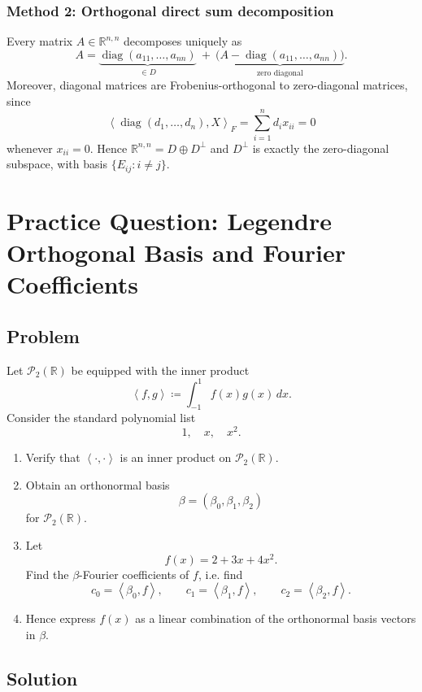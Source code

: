 \documentclass[12pt]{article}
\newcommand{\df}{\coloneqq}
\newcommand{\R}{\mathbb{R}}
\newcommand{\cP}{\mathcal{P}}
\DeclareMathOperator{\diag}{diag}
\newcommand{\ip}[2]{\left\langle #1,#2\right\rangle}
\begin{document}
\subsubsection{Method 2: Orthogonal direct sum decomposition}
Every matrix $A\in\R^{n,n}$ decomposes uniquely as
\[
A=\underbrace{\diag(a_{11},\dots,a_{nn})}_{\in D}\ +\ \underbrace{\bigl(A-\diag(a_{11},\dots,a_{nn})\bigr)}_{\text{zero diagonal}}.
\]
Moreover, diagonal matrices are Frobenius-orthogonal to zero-diagonal matrices, since
\[
\ip{\diag(d_1,\dots,d_n)}{X}_F=\sum_{i=1}^n d_i x_{ii}=0
\]
whenever $x_{ii}=0$. Hence $\R^{n,n}=D\oplus D^\perp$ and $D^\perp$ is exactly the zero-diagonal subspace,
with basis $\{E_{ij}:i\neq j\}$.

\section{Practice Question: Legendre Orthogonal Basis and Fourier Coefficients}

\subsection{Problem}
Let $\cP_2(\R)$ be equipped with the inner product
\[
  \ip{f}{g}\df \int_{-1}^{1} f(x)g(x)\,dx.
\]
Consider the standard polynomial list
\[
  1,\quad x,\quad x^2.
\]

\begin{enumerate}[label=(\alph*)]
  \item Verify that $\ip{\cdot}{\cdot}$ is an inner product on $\cP_2(\R)$.

  \item Obtain an orthonormal basis
  \[
    \beta=(\beta_0,\beta_1,\beta_2)
  \]
  for $\cP_2(\R)$.

  \item Let
  \[
    f(x)=2+3x+4x^2.
  \]
  Find the $\beta$-Fourier coefficients of $f$, i.e. find
  \[
    c_0=\ip{\beta_0}{f},\qquad
    c_1=\ip{\beta_1}{f},\qquad
    c_2=\ip{\beta_2}{f}.
  \]

  \item Hence express $f(x)$ as a linear combination of the orthonormal basis vectors in $\beta$.
\end{enumerate}

\newpage
\subsection{Solution}
\end{document}
